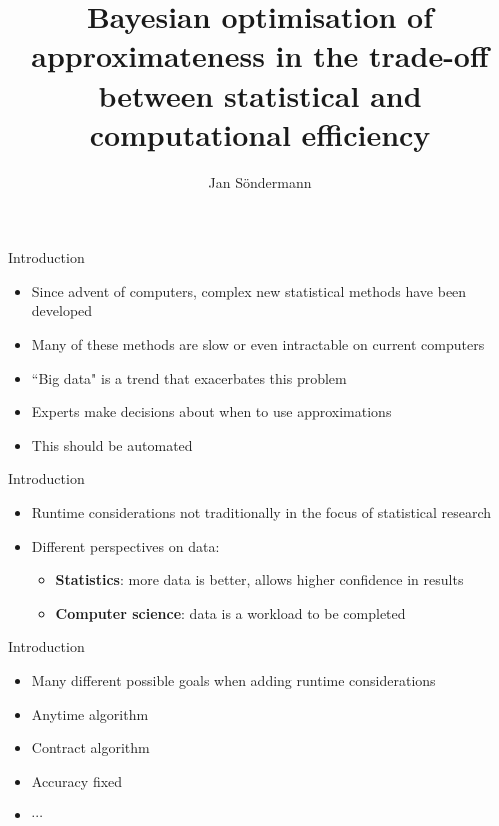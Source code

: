 \documentclass[handout]{beamer}
\title{Bayesian optimisation of approximateness in the trade-off between statistical and computational efficiency}
\author{Jan S\"ondermann}
\institute{University of Cambridge}
\begin{document}
\begin{frame}
  \titlepage
\end{frame}


\begin{frame}{Introduction}
\begin{itemize}
\item<1-> Since advent of computers, complex new statistical methods have been developed
\item<2-> Many of these methods are slow or even intractable on current computers
\item<3-> ``Big data" is a trend that exacerbates this problem
\item<4-> Experts make decisions about when to use approximations
\item<5-> This should be automated
\end{itemize}
\end{frame}

\begin{frame}{Introduction}
\begin{itemize}
\item<1-> Runtime considerations not traditionally in the focus of statistical research

\item<2-> Different perspectives on data:
\begin{itemize}
\item<3-> \textbf{Statistics}: more data is better, allows higher confidence in results
\item<4-> \textbf{Computer science}: data is a workload to be completed
\end{itemize}
\end{itemize}
\end{frame}

\begin{frame}{Introduction}
\begin{itemize}
\item<1-> Many different possible goals when adding runtime considerations
\item<2-> Anytime algorithm
\item<3-> Contract algorithm
\item<4-> Accuracy fixed
\item<5-> $\cdots$
\end{itemize}
\end{frame}
\end{document}
